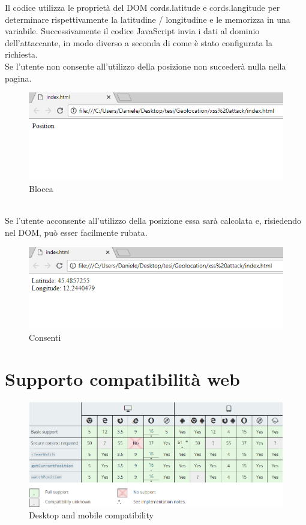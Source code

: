 \documentclass[11pt ,a4paper , twoside , openright ]{article}
\begin{document}
Il codice utilizza le proprietà del DOM cords.latitude e cords.langitude per determinare rispettivamente la latitudine / longitudine e le memorizza in una variabile. Successivamente il codice JavaScript invia i dati al dominio dell'attaccante, in modo diverso a seconda di come è stato configurata la richiesta.	
\\
Se l'utente non consente all'utilizzo della posizione non succederà nulla nella pagina.
\begin{figure}[h]
	\centering
	\includegraphics[width=1\linewidth]{Blocca}
	\caption{Blocca}
	\label{fig: Blocca}
\end{figure}
\pagebreak
\\
Se l'utente acconsente all'utilizzo della posizione essa sarà calcolata e, risiedendo nel DOM, può esser facilmente rubata.
\begin{figure}[h]
	\centering
	\includegraphics[width=1\linewidth]{Consenti}
	\caption{Consenti}
	\label{fig: Consenti}
\end{figure}
\newpage
\section{Supporto compatibilità web}
\begin{figure}[h]
	\centering
	\includegraphics[width=1\linewidth]{compatibility}
	\caption{Desktop and mobile compatibility}
	\label{fig: Desktop and mobile compatibility}
\end{figure}
\end{document}
